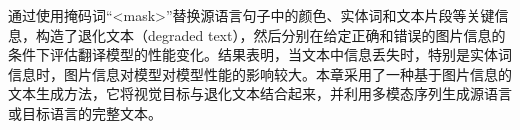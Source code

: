 通过使用掩码词“<mask>”替换源语言句子中的颜色、实体词和文本片段等关键信息，构造了退化文本（degraded text），然后分别在给定正确和错误的图片信息的条件下评估翻译模型的性能变化。结果表明，当文本中信息丢失时，特别是实体词信息时，图片信息对模型对模型性能的影响较大。本章采用了一种基于图片信息的文本生成方法，它将视觉目标与退化文本结合起来，并利用多模态序列生成源语言或目标语言的完整文本。


